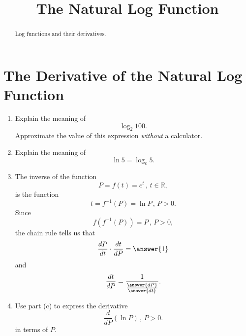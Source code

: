 \documentclass{ximera}
\title{The Natural Log Function}
\begin{document}
\begin{abstract}
Log functions and their derivatives.
\end{abstract}
\maketitle


\section{The Derivative of the Natural Log Function}
\begin{question} \label{Qdfggghghhfll}

\begin{enumerate}
\item Explain the meaning of
\[
    \log_2 100.
\] 
Approximate the value of this expression \emph{without} a calculator.
\begin{freeResponse}
\end{freeResponse}

\item Explain the meaning of 
\[
  \ln 5 = \log_e 5 .
\]
\begin{freeResponse}
\end{freeResponse}


\item The inverse of the function
\[
      P = f(t) = e^t \, , \, t\in\mathbb{R},
\]
is the function 
\[
  t = f^{-1}(P) = \ln P \, , \, P>0.
\]
Since 
\[
      f(f^{-1}(P)) = P \, , \, P>0,
\]
the chain rule tells us that
\[
     \frac{dP}{dt} \cdot \frac{dt}{dP} = \answer{1}
\]
and
\[
   \frac{dt}{dP} = \frac{1}{\frac{{\answer {dP}}}{\answer{dt}}}.
\]


\item Use part (c) to express the derivative
\[
 \frac{d}{dP} \left(  \ln P \right ) \, , \, P>0.
\]
in terms of $P$.
\begin{freeResponse}
\end{freeResponse}
\end{enumerate}


\end{question}
\end{document}
